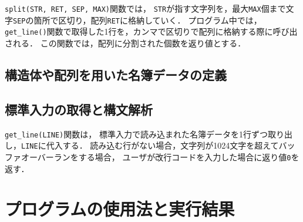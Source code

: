 \verb|split(STR, RET, SEP, MAX)|関数では，
\verb|STR|が指す文字列を，最大\verb|MAX|個まで文字\verb|SEP|の箇所で区切り，配列\verb|RET|に格納していく．
プログラム中では，\verb|get_line()|関数で取得した1行を，カンマで区切りで配列に格納する際に呼び出される．
この関数では，配列に分割された個数を返り値とする．


\subsection{構造体や配列を用いた名簿データの定義}




\subsection{標準入力の取得と構文解析}

\verb|get_line(LINE)|関数は，
標準入力で読み込まれた名簿データを1行ずつ取り出し，\verb|LINE|に代入する．
読み込む行がない場合，文字列が1024文字を超えてバッファオーバーランをする場合，
ユーザが改行コードを入力した場合に返り値\verb|0|を返す．

\section{プログラムの使用法と実行結果} \label{sec:4}

